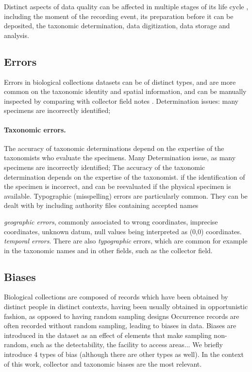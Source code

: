 Distinct aspects of data quality can be affected in multiple stages of its life cycle \cite{Chapman2005}, including the moment of the recording event, its preparation before it can be deposited, the taxonomic determination, data digitization, data storage and analysis.

\subsection{Errors}
Errors in biological collections datasets can be of distinct types, and are more common on the taxonomic identity and spatial information, and can be manually inspected by comparing with collector field notes \cite{Graham2004}.
Determination issues: many specimens are incorrectly identified;
%
\paragraph*{Taxonomic errors.}
The accuracy of taxonomic determinations depend on the expertise of the taxonomists who evaluate the specimens.
Many 
Determination issue, as many specimens are incorrectly identified;
The accuracy of the taxonomic determination depends on the expertise of the taxonomist.
if the identification of the specimen is incorrect, and can be reevaluated if the physical specimen is available.
Typographic (misspelling) errors are particularly common.
They can be dealt with by including authority files containing accepted names 

\textit{geographic errors}, commonly associated to wrong coordinates, imprecise coordinates, unknown datum, null values being interpreted as (0,0) coordinates.
%
\textit{temporal errors}.
%
There are also \textit{typographic} errors, which are common for example in the taxonomic names and in other fields, such as the collector field.



\subsection{Biases}
Biological collections are composed of records which have been obtained by distinct people in distinct contexts, having been usually obtained in opportunistic fashion, as opposed to having random sampling designs
Occurrence records are often recorded without random sampling, leading to biases in data.
Biases are introduced in the dataset as an effect of elements that make sampling non-random, such as the detectability, the facility to access areas...
We briefly introduce 4 types of bias (although there are other types as well).
In the context of this work, collector and taxonomic biases are the most relevant.

